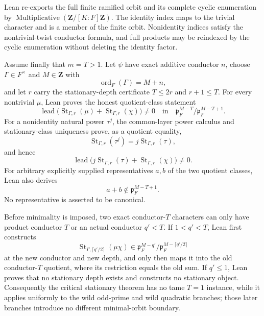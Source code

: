 \begin{lemma}
Lean re-exports the full finite ramified orbit and its complete cyclic
enumeration by $\operatorname{Multiplicative}(\mathbf Z/[K:F]\mathbf Z)$.
The identity index maps to the trivial character and is a member of the
finite orbit.  Nonidentity indices satisfy the nontrivial-twist conductor
formula, and full products may be reindexed by the cyclic enumeration
without deleting the identity factor.

Assume finally that $m=T>1$.  Let $\psi$ have exact additive conductor
$n$, choose $\Gamma\in F^\times$ and $M\in\mathbf Z$ with
\[
 \operatorname{ord}_F(\Gamma)=M+n,
\]
and let $r$ carry the stationary-depth certificate
$T\le2r$ and $r+1\le T$.  For every nontrivial $\mu$, Lean proves the
honest quotient-class statement
\[
 \operatorname{lead}\bigl(
   \operatorname{St}_{\Gamma,r}(\mu)
   +\operatorname{St}_{\Gamma,r}(\chi)\bigr)\ne0
 \quad\text{in}\quad
 \mathfrak p_F^{M-T}/\mathfrak p_F^{M-T+1}.
\]
For a nonidentity natural power $\tau^j$, the common-layer power calculus
and stationary-class uniqueness prove, as a quotient equality,
\[
 \operatorname{St}_{\Gamma,r}(\tau^j)
 =j\operatorname{St}_{\Gamma,r}(\tau),
\]
and hence
\[
 \operatorname{lead}\bigl(
   j\operatorname{St}_{\Gamma,r}(\tau)
   +\operatorname{St}_{\Gamma,r}(\chi)\bigr)\ne0.
\]
For arbitrary explicitly supplied representatives $a,b$ of the two
quotient classes, Lean also derives
\[
 a+b\notin\mathfrak p_F^{M-T+1}.
\]
No representative is asserted to be canonical.

Before minimality is imposed, two exact conductor-$T$ characters can only
have product conductor $T$ or an actual conductor $q'<T$.  If
$1<q'<T$, Lean first constructs
\[
 \operatorname{St}_{\Gamma,\lceil q'/2\rceil}(\mu\chi)
 \in
 \mathfrak p_F^{M-q'}/
 \mathfrak p_F^{M-\lceil q'/2\rceil}
\]
at the new conductor and new depth, and only then maps it into the old
conductor-$T$ quotient, where its restriction equals the old sum.  If
$q'\le1$, Lean proves that no stationary depth exists and constructs no
stationary object.  Consequently the critical stationary theorem has no
tame $T=1$ instance, while it applies uniformly to the wild odd-prime and
wild quadratic branches; those later branches introduce no different
minimal-orbit boundary.


\end{lemma}
